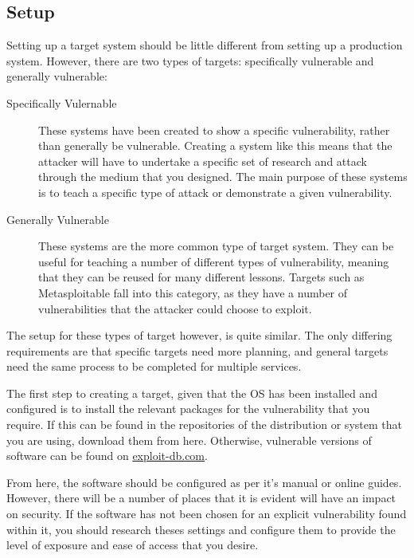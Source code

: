 		\subsection{Setup}
			Setting up a target system should be little different from setting up a production system. 
			However, there are two types of targets: specifically vulnerable and generally vulnerable:
			\begin{description}
				\item[Specifically Vulernable]
					These systems have been created to show a specific vulnerability, rather than generally be vulnerable. 
					Creating a system like this means that the attacker will have to undertake a specific set of research
					and attack through the medium that you designed. 
					The main purpose of these systems is to teach a specific type of attack or demonstrate a given vulnerability. 
				\item[Generally Vulnerable]
					These systems are the more common type of target system. 
					They can be useful for teaching a number of different types of vulnerability, meaning that they can be reused for many different lessons. 
					Targets such as Metasploitable fall into this category, as they have a number of vulnerabilities that the attacker could choose to exploit. 
			\end{description}

			The setup for these types of target however, is quite similar. 
			The only differing requirements are that specific targets need more planning, and general targets need the same process to be completed for multiple services. 

			The first step to creating a target, given that the OS has been installed and configured is to install the relevant packages for the vulnerability that you require. 
			If this can be found in the repositories of the distribution or system that you are using, download them from here. 
			Otherwise, vulnerable versions of software can be found on \href{https://www.exploit-db.com/remote/?order\_by=application&order=desc&pg=1}{exploit-db.com}.

			From here, the software should be configured as per it's manual or online guides. 
			However, there will be a number of places that it is evident will have an impact on security. 
			If the software has not been chosen for an explicit vulnerability found within it, you should research theses settings and configure them to provide the level of exposure and ease of access that you desire. 

